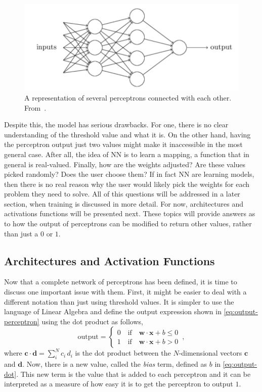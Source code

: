 \begin{figure}
    \centering
    \includegraphics[scale=0.4]{figuras/capitulo-3/multi-perceptron}
    \caption{A representation of several perceptrons connected with each other. From~\cite{nielsenNeuralNetworksDeep2015}.}
    \label{fig:multi-perceptron}
\end{figure}

Despite this, the model has serious drawbacks. For one, 
there is no clear understanding of the threshold value and what it is. On the other hand, 
having the perceptron output just two values might make it inaccessible in the most general 
case. After all, the idea of NN is to learn a mapping, a function that in general is 
real-valued. Finally, how are the weights adjusted? Are these values picked randomly? Does 
the user choose them? If in fact NN are learning models, then there is no real reason why 
the user would likely pick the weights for each problem they need to solve. All of this 
questions will be addressed in a later section, when training is discussed in more detail.
For now, architectures and activations functions will be presented next. These topics will
provide answers as to how the output of perceptrons can be modified to return other values,
rather than just a \(0\) or \(1\).

\subsection{Architectures and Activation Functions}
Now that a complete network of perceptrons has been defined, it is time to discuss one 
important issue with them. First, it might be easier to deal with a different notation 
than just using threshold values. It is simpler to use the language of Linear Algebra 
and define the output expression shown in \autoref{eq:output-perceptron} using the dot product as follows,
\begin{equation}
    \text{output} = \begin{cases}
        0 \quad \text{if} \quad \bm{w} \cdot \bm{x} + b \leq 0 \\
        1 \quad \text{if} \quad \bm{w} \cdot \bm{x} + b > 0
    \end{cases}
    \, ,
    \label{eq:output-dot}
\end{equation}
where \(\bm{c} \cdot \bm{d} = \sum_{i}^{N} c_i \, d_i\) is the dot product between 
the $N$-dimensional vectors \(\bm{c}\) and \(\bm{d}\). Now, there is a new value, 
called the \emph{bias} term, defined as \(b\) in \autoref{eq:output-dot}. This new term is 
the value that is added to each perceptron and it can be interpreted as a measure of how 
easy it is to get the perceptron to output \(1\).

